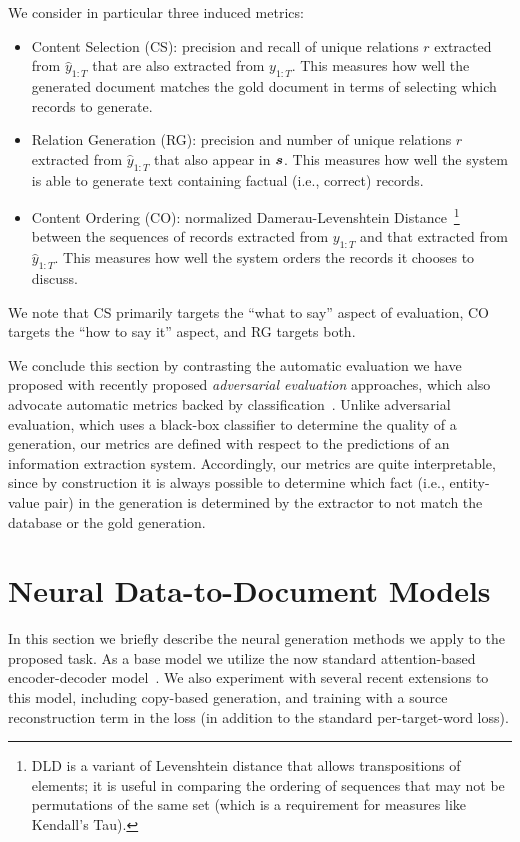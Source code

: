 \documentclass[11pt,letterpaper]{article}
\begin{document}
We consider in particular three induced metrics:
\begin{itemize}
\item Content Selection (CS): precision and recall of unique relations $r$ extracted from $\hat{y}_{1:T}$ that are also extracted from $y_{1:T}$. This measures how well the generated document matches the gold document in terms of selecting which records to generate. 
\item Relation Generation (RG): precision and number of unique relations $r$ extracted from $\hat{y}_{1:T}$ that also appear in $\boldsymbol{s}$. This measures how well the system is able to generate text containing factual (i.e., correct) records. 
\item Content Ordering (CO): normalized Damerau-Levenshtein
  Distance~\cite{brill2000improved}\footnote{DLD is a variant of
    Levenshtein distance that allows transpositions of elements; it is useful in comparing the
    ordering of sequences that may not be permutations of the same set (which is a requirement for measures like Kendall's Tau). }
  between the sequences of records extracted from $y_{1:T}$ and that extracted
  from $\hat{y}_{1:T}$. This measures how well the system orders the records it chooses to discuss.
\end{itemize} 

\noindent We note that CS primarily targets the ``what to say'' aspect of evaluation, CO targets the ``how to say it'' aspect, and RG targets both. 

We conclude this section by contrasting the automatic evaluation we have proposed with recently proposed \textit{adversarial evaluation} approaches, which also advocate automatic metrics backed by classification~\cite{bowman2016generating,kannan2016adversarial, li2017adversarial}. Unlike adversarial evaluation, which uses a black-box classifier to determine the quality of a generation, our metrics are defined with respect to the predictions of an information extraction system. Accordingly, our metrics are quite interpretable, since by construction it is always possible to determine which fact (i.e., entity-value pair) in the generation is determined by the extractor to not match the database or the gold generation.

\section{Neural Data-to-Document Models}
\label{sec:models}
In this section we briefly describe the neural generation methods we apply to the proposed task. As a base model we utilize the now standard attention-based encoder-decoder model~\citep{sutskever2014sequence,cho2014on,bahdanau2015neural}. We also experiment with several recent extensions to this model, including copy-based generation, and training with a source reconstruction term in the loss (in addition to the standard per-target-word loss). 
\end{document}
